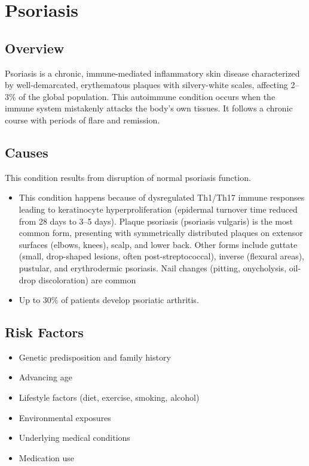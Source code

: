 \chapter{Psoriasis}
\label{sec:Psoriasis}

\section{Overview}
Psoriasis is a chronic, immune-mediated inflammatory skin disease characterized by well-demarcated, erythematous plaques with silvery-white scales, affecting 2--3\% of the global population. This autoimmune condition occurs when the immune system mistakenly attacks the body's own tissues. It follows a chronic course with periods of flare and remission.
\section{Causes}
This condition results from disruption of normal psoriasis function.

\begin{itemize}[noitemsep]
  \item This condition happens because of dysregulated Th1/Th17 immune responses leading to keratinocyte hyperproliferation (epidermal turnover time reduced from 28 days to 3--5 days). Plaque psoriasis (psoriasis vulgaris) is the most common form, presenting with symmetrically distributed plaques on extensor surfaces (elbows, knees), scalp, and lower back. Other forms include guttate (small, drop-shaped lesions, often post-streptococcal), inverse (flexural areas), pustular, and erythrodermic psoriasis. Nail changes (pitting, onycholysis, oil-drop discoloration) are common
  \item Up to 30\% of patients develop psoriatic arthritis.
\end{itemize}
\section{Risk Factors}


\begin{itemize}[noitemsep]
  \item Genetic predisposition and family history
  \item Advancing age
  \item Lifestyle factors (diet, exercise, smoking, alcohol)
  \item Environmental exposures
  \item Underlying medical conditions
  \item Medication use
\end{itemize}
